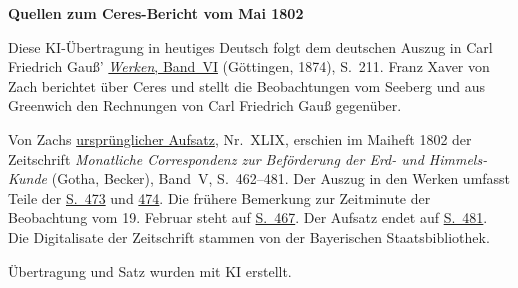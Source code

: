 \clearpage\thispagestyle{empty}
\begin{center}\textbf{Quellen zum Ceres-Bericht vom Mai 1802}\end{center}
\noindent Diese KI-Übertragung in heutiges Deutsch folgt dem deutschen Auszug in Carl Friedrich Gauß’ \href{https://gdz.sub.uni-goettingen.de/id/PPN236007467}{\textit{Werken}, Band~VI} (Göttingen, 1874), S.~211. Franz Xaver von Zach berichtet über Ceres und stellt die Beobachtungen vom Seeberg und aus Greenwich den Rechnungen von Carl Friedrich Gauß gegenüber.
\par\smallskip\noindent Von Zachs \href{https://api.digitale-sammlungen.de/iiif/image/v2/bsb10538597_00474/full/1450,/0/default.jpg}{ursprünglicher Aufsatz}, Nr.~XLIX, erschien im Maiheft 1802 der Zeitschrift \textit{Monatliche Correspondenz zur Beförderung der Erd- und Himmels-Kunde} (Gotha, Becker), Band~V, S.~462--481. Der Auszug in den Werken umfasst Teile der \href{https://api.digitale-sammlungen.de/iiif/image/v2/bsb10538597_00485/full/1450,/0/default.jpg}{S.~473} und \href{https://api.digitale-sammlungen.de/iiif/image/v2/bsb10538597_00486/full/1450,/0/default.jpg}{474}. Die frühere Bemerkung zur Zeitminute der Beobachtung vom 19. Februar steht auf \href{https://api.digitale-sammlungen.de/iiif/image/v2/bsb10538597_00479/full/1450,/0/default.jpg}{S.~467}. Der Aufsatz endet auf \href{https://api.digitale-sammlungen.de/iiif/image/v2/bsb10538597_00493/full/1450,/0/default.jpg}{S.~481}. Die Digitalisate der Zeitschrift stammen von der Bayerischen Staatsbibliothek.
\par\smallskip\noindent Übertragung und Satz wurden mit KI erstellt.
\clearpage
